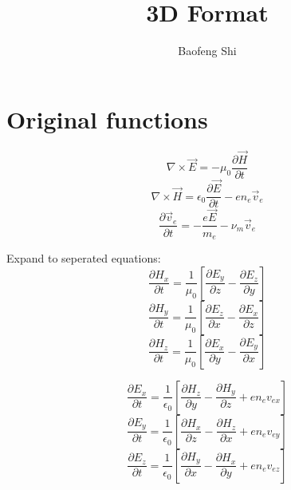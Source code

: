 \documentclass[a4paper,10pt]{article}
\title{3D Format}
\author{Baofeng Shi}
\begin{document}
\maketitle
\section{Original functions}
\begin{equation}
\nabla \times \vec{E}=-\mu_{0}\frac{\partial \vec{H}}{\partial t}
\end{equation}
\begin{equation}
\nabla \times \vec{H}=\epsilon_{0}\frac{\partial \vec{E}}{\partial t}-e n_{e}\vec{v}_{e}
\end{equation}
\begin{equation}
\frac{\partial\vec{v}_{e}}{\partial t}=-\frac{e\vec{E}}{m_{e}}-\nu_{m}\vec{v}_{e}
\end{equation}

Expand to seperated equations:
\begin{equation}\label{eqHx}
\frac{\partial H_{x}}{\partial t}=\frac{1}{\mu_{0}}\left[\frac{\partial E_{y}}{\partial z}-\frac{\partial E_{z}}{\partial y}\right]
\end{equation}
\begin{equation}\label{eqHy}
\frac{\partial H_{y}}{\partial t}=\frac{1}{\mu_{0}}\left[\frac{\partial E_{z}}{\partial x}-\frac{\partial E_{x}}{\partial z}\right]
\end{equation}
\begin{equation}\label{eqHz}
\frac{\partial H_{z}}{\partial t}=\frac{1}{\mu_{0}}\left[\frac{\partial E_{x}}{\partial y}-\frac{\partial E_{y}}{\partial x}\right]
\end{equation}

\begin{equation}\label{eqEx}
\frac{\partial E_{x}}{\partial t}=\frac{1}{\epsilon_{0}}\left[\frac{\partial H_{z}}{\partial y}-\frac{\partial H_{y}}{\partial z}+e n_{e}v_{ex}\right]
\end{equation}
\begin{equation}\label{eqEy}
\frac{\partial E_{y}}{\partial t}=\frac{1}{\epsilon_{0}}\left[\frac{\partial H_{x}}{\partial z}-\frac{\partial H_{z}}{\partial x}+e n_{e}v_{ey}\right]
\end{equation}
\begin{equation}\label{eqEz}
\frac{\partial E_{z}}{\partial t}=\frac{1}{\epsilon_{0}}\left[\frac{\partial H_{y}}{\partial x}-\frac{\partial H_{x}}{\partial y}+e n_{e}v_{ez}\right]
\end{equation}
\end{document}
